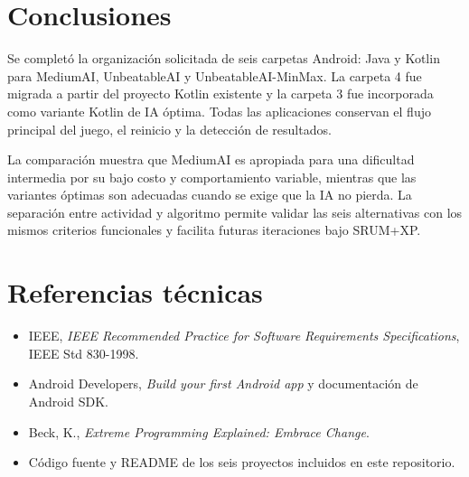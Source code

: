 \documentclass[stu,a4paper,12pt,floatsintext]{apa7}
\begin{document}
\section{Conclusiones}
Se completó la organización solicitada de seis carpetas Android: Java y Kotlin
para MediumAI, UnbeatableAI y UnbeatableAI-MinMax. La carpeta 4 fue migrada a
partir del proyecto Kotlin existente y la carpeta 3 fue incorporada como
variante Kotlin de IA óptima. Todas las aplicaciones conservan el flujo
principal del juego, el reinicio y la detección de resultados.

La comparación muestra que MediumAI es apropiada para una dificultad
intermedia por su bajo costo y comportamiento variable, mientras que las
variantes óptimas son adecuadas cuando se exige que la IA no pierda. La
separación entre actividad y algoritmo permite validar las seis alternativas
con los mismos criterios funcionales y facilita futuras iteraciones bajo
SRUM+XP.

\section*{Referencias técnicas}
\begin{itemize}
  \item IEEE, \emph{IEEE Recommended Practice for Software Requirements
        Specifications}, IEEE Std 830-1998.
  \item Android Developers, \emph{Build your first Android app} y
        documentación de Android SDK.
  \item Beck, K., \emph{Extreme Programming Explained: Embrace Change}.
  \item Código fuente y README de los seis proyectos incluidos en este
        repositorio.
\end{itemize}
\end{document}
